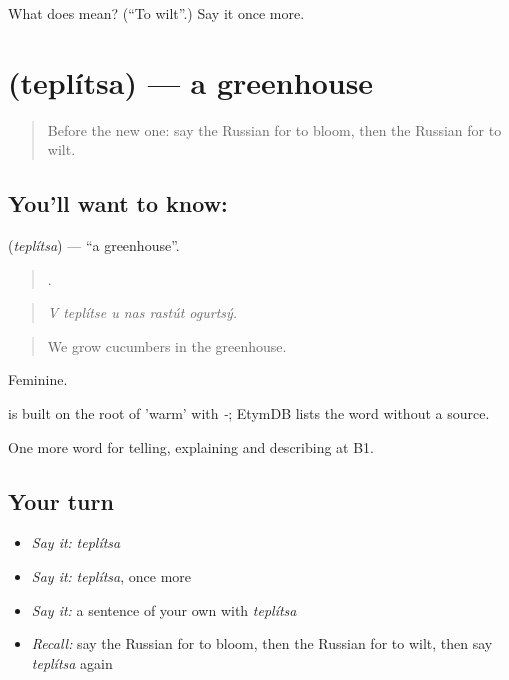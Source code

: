 \begin{tcolorbox}[breakable,colback=teal!4,colframe=teal!35!black,title={Before you move on}]
What does  mean? (\textquotedblleft{}To wilt\textquotedblright{}.) Say it once more.
\end{tcolorbox}
\section[\texorpdfstring{\ru{теплица} (teplítsa)}{теплица (teplítsa)}]{ (teplítsa) — a greenhouse}

\label{lesson:RU-C507-teplitsa}



\begin{quote}
Before the new one: say the Russian for to bloom, then the Russian for to wilt.
\end{quote}

\subsection*{You'll want to know: }
\textbf{} (\emph{teplítsa}) — \textquotedblleft{}a greenhouse\textquotedblright{}.

\begin{quote}
     .
\end{quote}

\begin{quote}
\emph{V teplítse u nas rastút ogurtsý.}
\end{quote}

\begin{quote}
We grow cucumbers in the greenhouse.
\end{quote}

Feminine.

\begin{cousinweb}
\emph{} is built on the root of \emph{} 'warm' with \emph{-}; EtymDB lists the word without a source.
\end{cousinweb}

\begin{grammarlens}[title={What you've built}]
One more word for telling, explaining and describing at B1.
\end{grammarlens}

\subsection*{Your turn}
\begin{itemize}
\raggedright
  \item \emph{Say it:} \emph{teplítsa}
  \item \emph{Say it:} \emph{teplítsa}, once more
  \item \emph{Say it:} a sentence of your own with \emph{teplítsa}
  \item \emph{Recall:} say the Russian for to bloom, then the Russian for to wilt, then say \emph{teplítsa} again
\end{itemize}

